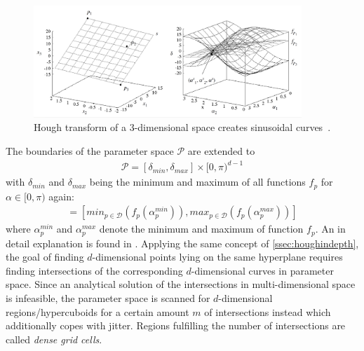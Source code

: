 \begin{figure}
    \centering
    \includegraphics[width=0.9\textwidth]{figures/cash3d.png}
    \caption{Hough transform of a 3-dimensional space creates sinusoidal curves~\cite{opticsankerst1999optics}.}
    \label{fig:cash3d}
\end{figure}

The boundaries of the parameter space $\mathcal{P}$ are extended to \begin{align}
    \mathcal{P} = [\delta_{min}, \delta_{max}]\times [0,\pi)^{d-1}
\end{align} with $\delta_{min}$ and $\delta_{max}$ being the minimum and maximum of all functions $f_p$ for $\alpha \in [0,\pi)$ again: 
\begin{align}
    [\delta_{min}, \delta_{max}] = [min_{p \in \mathcal{D}}(f_p(\alpha_p^{min})), max_{p \in \mathcal{D}}(f_p(\alpha_p^{max}))]
\end{align} 
where $\alpha_p^{min}$ and $\alpha_p^{max}$ denote the minimum and maximum of function $f_p$. An in detail explanation is found in \citeauthor{CASHachtert2008robust}.
Applying the same concept of \autoref{ssec:houghindepth}, the goal of finding $d$-dimensional points lying on the same hyperplane requires finding intersections of the corresponding $d$-dimensional curves in parameter space. Since an analytical solution of the intersections in multi-dimensional space is infeasible, the parameter space is scanned for $d$-dimensional regions/hypercuboids for a certain amount $m$ of intersections instead which additionally copes with jitter. Regions fulfilling the number of intersections are called \textit{dense grid cells}.

